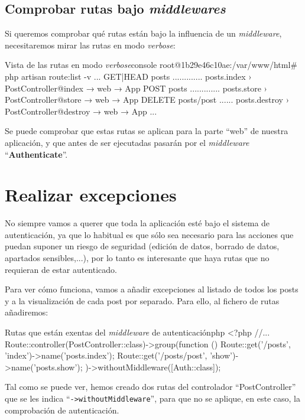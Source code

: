 \section{Comprobar rutas bajo \textit{middlewares}}
Si queremos comprobar qué rutas están bajo la influencia de un \textit{middleware}, necesitaremos mirar las rutas en modo \textit{verbose}:


\begin{mycode}{Vista de las rutas en modo \textit{verbose}}{console}{}
root@1b29e46c10ae:/var/www/html# php artisan route:list -v
...
GET|HEAD  posts ............. posts.index › PostController@index
 → web
 → App\Http\Middleware\Authenticate
POST      posts ............. posts.store › PostController@store
 → web
 → App\Http\Middleware\Authenticate
DELETE    posts/{post} ...... posts.destroy › PostController@destroy
 → web
 → App\Http\Middleware\Authenticate
...
\end{mycode}

Se puede comprobar que estas rutas se aplican para la parte “web” de nuestra aplicación, y que antes de ser ejecutadas pasarán por el \textit{middleware} “\textbf{Authenticate}”.

\chapter{Realizar excepciones}

No siempre vamos a querer que toda la aplicación esté bajo el sistema de autenticación, ya que lo habitual es que sólo sea necesario para las acciones que puedan suponer un riesgo de seguridad (edición de datos, borrado de datos, apartados sensibles,...), por lo tanto es interesante que haya rutas que no requieran de estar autenticado.

Para ver cómo funciona, vamos a añadir excepciones al listado de todos los posts y a la visualización de cada post por separado. Para ello, al fichero de rutas añadiremos:

\begin{mycode}{Rutas que están exentas del \textit{middleware} de autenticación}{php}{}
<?php
//...
Route::controller(PostController::class)->group(function () {
    Route::get('/posts', 'index')->name('posts.index');
    Route::get('/posts/{post}', 'show')->name('posts.show');
})->withoutMiddleware([Auth::class]);
\end{mycode}

Tal como se puede ver, hemos creado dos rutas del controlador “PostController” que se les indica “\texttt{->withoutMiddleware}”, para que no se aplique, en este caso, la comprobación de autenticación.


